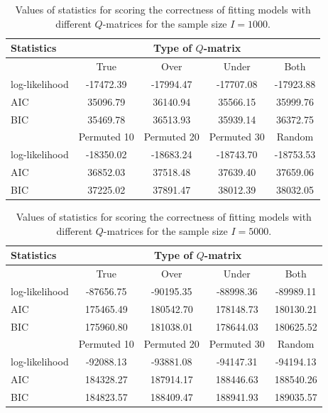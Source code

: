 \documentclass[english]{pwr_wmat_praca_dyplomowa}
\theoremstyle{plain}
\numberwithin{theorem}{chapter}
\theoremstyle{definition}
\numberwithin{theorem}{chapter}
\begin{document}
	\begin{table}[h]
		\centering
		\begin{tabular}{l c c c c} 
			\hline
			{\rule{0pt}{3ex}}Statistics & \multicolumn{4}{c}{Type of $Q$-matrix} \\ [0.5ex]
			\hline
			{\rule{0pt}{3ex}}& True & Over & Under & Both \\\cmidrule{2-5}
			log-likelihood & -17472.39 & -17994.47 & -17707.08 & -17923.88 \\ 
			AIC & 35096.79 & 36140.94 & 35566.15 & 35999.76 \\ 
			BIC & 35469.78 & 36513.93 & 35939.14 & 36372.75\\
			\hline
			{\rule{0pt}{3ex}}& Permuted 10 & Permuted 20 & Permuted 30 & Random \\\cmidrule{2-5}
			log-likelihood & -18350.02 & -18683.24 & -18743.70 & -18753.53 \\ 
			AIC & 36852.03 & 37518.48 & 37639.40 & 37659.06 \\ 
			BIC & 37225.02 & 37891.47 & 38012.39 & 38032.05\\ 
			[0.5ex] 
			\hline 
		\end{tabular}
		\caption{Values of statistics for scoring the correctness of fitting models with different $Q$-matrices for the sample size $I=1000$.}
		\label{tab:estimations_qmat} 
	\end{table}
	
	\begin{table}[h]
		\centering
		\begin{tabular}{l c c c c} 
			\hline
			{\rule{0pt}{3ex}}Statistics & \multicolumn{4}{c}{Type of $Q$-matrix} \\ [0.5ex]
			\hline
			{\rule{0pt}{3ex}}&True & Over & Under & Both \\\cmidrule{2-5}
			log-likelihood & -87656.75 & -90195.35 & -88998.36 & -89989.11 \\ 
			AIC & 175465.49 & 180542.70 & 178148.73 & 180130.21 \\ 
			BIC & 175960.80 & 181038.01 & 178644.03 & 180625.52\\
			\hline
			{\rule{0pt}{3ex}}& Permuted 10 & Permuted 20 & Permuted 30 & Random \\\cmidrule{2-5}
			log-likelihood & -92088.13 & -93881.08 & -94147.31 & -94194.13 \\ 
			AIC & 184328.27 & 187914.17 & 188446.63 & 188540.26 \\ 
			BIC & 184823.57 & 188409.47 & 188941.93 & 189035.57\\ 
			[0.5ex] 
			\hline 
		\end{tabular}
		\caption{Values of statistics for scoring the correctness of fitting models with different $Q$-matrices for the sample size $I=5000$.}
		\label{tab:estimations_qmat2} 
	\end{table}
	
\end{document}
